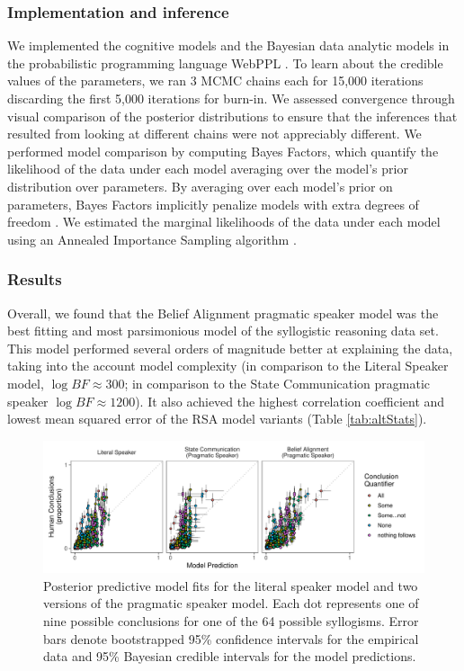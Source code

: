 \documentclass[floatsintext, doc]{apa6}
\begin{document}
\subsubsection{Implementation and inference}

We implemented the cognitive models and the Bayesian data analytic models in the probabilistic programming language WebPPL \cite{dippl}. 
To learn about the credible values of the parameters, we ran 3 MCMC chains each for 15,000 iterations discarding the first 5,000 iterations for burn-in. 
We assessed convergence through visual comparison of the posterior distributions to ensure that the inferences that resulted from looking at different chains were not appreciably different.
We performed model comparison by computing Bayes Factors, which quantify the likelihood of the data under each model averaging over the model's prior distribution over parameters. By averaging over each model's prior on parameters, Bayes Factors implicitly penalize models with extra degrees of freedom \cite{lee2014bayesian}.
We estimated the marginal likelihoods of the data under each model using an Annealed Importance Sampling algorithm \cite{neal2001annealed}.

\subsubsection{Results}

Overall, we found that the Belief Alignment pragmatic speaker model was the best fitting and most parsimonious model of the syllogistic reasoning data set. 
This model performed several orders of magnitude better at explaining the data, taking into the account model complexity (in comparison to the Literal Speaker model, $\log BF \approx 300$; in comparison to the State Communication pragmatic speaker $\log BF \approx 1200$).
It also achieved the highest correlation coefficient and lowest mean squared error of the RSA model variants (Table \ref{tab:altStats}).

\begin{figure}[t]
\centering
\includegraphics[width = \textwidth]{figs/bda_rsa_scatters.pdf}
\caption{Posterior predictive model fits for the literal speaker model and two versions of the pragmatic speaker model. Each dot represents one of nine possible conclusions for one of the 64 possible syllogisms. Error bars denote bootstrapped 95\% confidence intervals for the empirical data and 95\% Bayesian credible intervals for the model predictions.}
\label{fig:scatters}
\end{figure}
\end{document}
